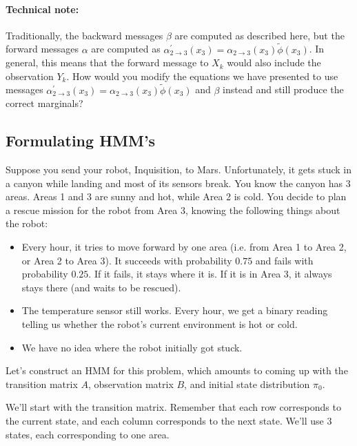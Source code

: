 \documentclass[6008notes.tex]{subfiles}
\begin{document}
\paragraph{Technical note:} Traditionally, the backward messages $\beta$ are computed as described here, but the forward messages $\alpha$ are computed as $\alpha ^\prime _{2 \to 3}(x_3) = \alpha _{2 \to 3}(x_3) \tilde{\phi }(x_3)$. In general, this means that the forward message to $X_k$ would also include the observation $Y_k$. How would you modify the equations we have presented to use messages $\alpha ^\prime _{2 \to 3}(x_3) = \alpha _{2 \to 3}(x_3) \tilde{\phi }(x_3)$ and $\beta$ instead and still produce the correct marginals?


\subsection{Formulating HMM's}

Suppose you send your robot, Inquisition, to Mars. Unfortunately, it gets stuck in a canyon while landing and most of its sensors break. You know the canyon has 3 areas. Areas 1 and 3 are sunny and hot, while Area 2 is cold. You decide to plan a rescue mission for the robot from Area 3, knowing the following things about the robot:

\begin{itemize}
\item Every hour, it tries to move forward by one area (i.e. from Area 1 to Area 2, or Area 2 to Area 3). It succeeds with probability $0.75$ and fails with probability $0.25$. If it fails, it stays where it is. If it is in Area 3, it always stays there (and waits to be rescued).

\item The temperature sensor still works. Every hour, we get a binary reading telling us whether the robot's current environment is hot or cold.

\item We have no idea where the robot initially got stuck.
\end{itemize}

Let's construct an HMM for this problem, which amounts to coming up with the transition matrix $A$, observation matrix $B$, and initial state distribution $\pi_0$.

We'll start with the transition matrix. Remember that each row corresponds to the current state, and each column corresponds to the next state. We'll use 3 states, each corresponding to one area.
\end{document}
